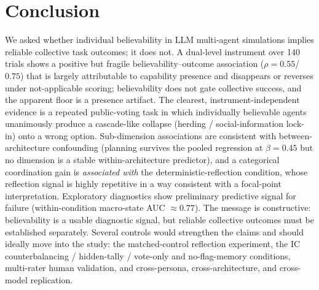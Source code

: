 \documentclass[runningheads]{llncs}
\begin{document}
\section{Conclusion}\label{sec:conclusion}
We asked whether individual believability in LLM multi-agent simulations implies reliable collective task outcomes; it does not. A dual-level instrument over 140 trials shows a positive but fragile believability--outcome association ($\rho = 0.55$/$0.75$) that is largely attributable to capability presence and disappears or reverses under not-applicable scoring; believability does not gate collective success, and the apparent floor is a presence artifact. The clearest, instrument-independent evidence is a repeated public-voting task in which individually believable agents unanimously produce a cascade-like collapse (herding / social-information lock-in) onto a wrong option. Sub-dimension associations are consistent with between-architecture confounding (planning survives the pooled regression at $\beta = 0.45$ but no dimension is a stable within-architecture predictor), and a categorical coordination gain is \emph{associated with} the deterministic-reflection condition, whose reflection signal is highly repetitive in a way consistent with a focal-point interpretation. Exploratory diagnostics show preliminary predictive signal for failure (within-condition macro-state AUC $\approx0.77$). The message is constructive: believability is a usable diagnostic signal, but reliable collective outcomes must be established separately. Several controls would strengthen the claims and should ideally move into the study: the matched-control reflection experiment, the IC counterbalancing / hidden-tally / vote-only and no-flag-memory conditions, multi-rater human validation, and cross-persona, cross-architecture, and cross-model replication.
\end{document}
